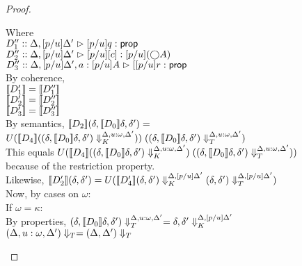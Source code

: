 \begin{proof}
\begin{enumerate}
\begin{itemize}
\begin{tabbedproof}
      \ooo Where \\ 
      \oooo $D''_1 :: \judgeA[{\Delta, [p/u]\Delta'}]{[p/u]q}{\assert}$ \\                  
      \oooo $D''_2 :: \judgeA[{\Delta, [p/u]\Delta'}]{[p/u]\comp{c}}{[p/u](\monad{A})}$ \\  
      \oooo $D''_3 :: \judgeA[{\Delta, [p/u]\Delta', a:[p/u]A}]{[[p/u]r}{\assert}$ \\      
      \ooo By coherence, \\
      \oooo $\interp{D'_1} = \interp{D''_1}$\\
      \oooo $\interp{D'_2} = \interp{D''_2}$\\
      \oooo $\interp{D'_3} = \interp{D''_3}$\\
      \ooo By semantics, $\interp{D_2}(\delta, \interp{D_0}\delta, \delta') =$ \\
      \oooox             $U(\interp{D_4}(\restricttyenv{\Delta, u:\omega, \Delta'}
                                                      {(\delta, \interp{D_0}\delta, \delta')}))\;
                                       (\restrictvals{\Delta, u:\omega, \Delta'}
                                                     {(\delta, \interp{D_0}\delta, \delta')})$\\
      \ooo This equals $U(\interp{D_4}(\restricttyenv{\Delta, u:\omega, \Delta'}
                                                      {(\delta, \interp{D_0}\delta, \delta')})\;
                                       (\restrictvals{\Delta, u:\omega, \Delta'}
                                                     {(\delta, \interp{D_0}\delta, \delta')}))$\\
      \ooo because of the restriction property. \\
      \ooo Likewise, $\interp{D'_2}(\delta, \delta') = 
                       U(\interp{D'_4}\restricttyenv{\Delta, [p/u]\Delta'}{(\delta, \delta')}
                                      \restrictvals{\Delta, [p/u]\Delta'}{(\delta, \delta')})$ \\
      \ooo Now, by cases on $\omega$: \\
      \oooo If $\omega = \kappa$: \\
      \ooooo By properties, $\restrictvals{\Delta, u:\omega, \Delta'}
                                          {(\delta, \interp{D_0}\delta, \delta')} = 
                              \restricttyenv{\Delta, [p/u]\Delta'}{\delta, \delta'}$ \\
      \ooooo $\restricttype{\Delta, u:\omega, \Delta'} = 
              \restricttype{\Delta, \Delta'}$ \\

\end{tabbedproof}
\end{itemize}
\end{enumerate}
\end{proof}
